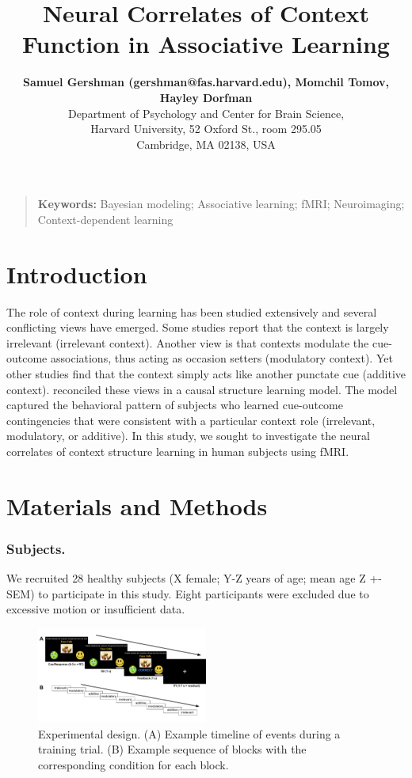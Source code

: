 \documentclass[10pt,letterpaper]{article}
\title{Neural Correlates of Context Function in Associative Learning}
\author{{\large \bf Samuel Gershman (gershman@fas.harvard.edu), Momchil Tomov, Hayley Dorfman}  \\
  Department of Psychology and Center for Brain Science,\\
  Harvard University, 52 Oxford St., room 295.05\\
Cambridge, MA 02138, USA}
\begin{document}
\maketitle


\begin{quote}
\small
\textbf{Keywords:} 
Bayesian modeling; Associative learning; fMRI; Neuroimaging; Context-dependent learning
\end{quote}

\section{Introduction}

The role of context during learning has been studied extensively and several conflicting views have emerged. Some studies report that the context is largely irrelevant (irrelevant context). Another view is that contexts modulate the cue-outcome associations, thus acting as occasion setters (modulatory context). Yet other studies find that the context simply acts like another punctate cue (additive context).  reconciled these views in a causal structure learning model. The model captured the behavioral pattern of subjects who learned cue-outcome contingencies that were consistent with a particular context role (irrelevant, modulatory, or additive). In this study, we sought to investigate the neural correlates of context structure learning in human subjects using fMRI.

\section{Materials and Methods}

\subsubsection{Subjects.}

We recruited 28 healthy subjects (X female; Y-Z years of age; mean age Z +- SEM) to participate in this study. Eight participants were excluded due to excessive motion or insufficient data.

\begin{figure}[ht]
\begin{center}
\includegraphics[width=0.5\textwidth]{task-design.pdf}
\end{center}
\vspace{-1em}
\caption{Experimental design. (A) Example timeline of events during a training trial. (B) Example sequence of blocks with the corresponding condition for each block. } 
\label{task-design}
\end{figure}
\end{document}
